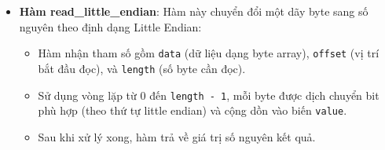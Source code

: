 \begin{itemize}
    \item \textbf{Hàm read\_little\_endian}: Hàm này chuyển đổi một dãy byte sang số nguyên theo định dạng Little Endian:
    \begin{itemize}
        \item Hàm nhận tham số gồm \texttt{data} (dữ liệu dạng byte array), \texttt{offset} (vị trí bắt đầu đọc), và \texttt{length} (số byte cần đọc).
        \item Sử dụng vòng lặp từ 0 đến \texttt{length - 1}, mỗi byte được dịch chuyển bit phù hợp (theo thứ tự little endian) và cộng dồn vào biến \texttt{value}.
        \item Sau khi xử lý xong, hàm trả về giá trị số nguyên kết quả.
    \end{itemize}
\end{itemize}
